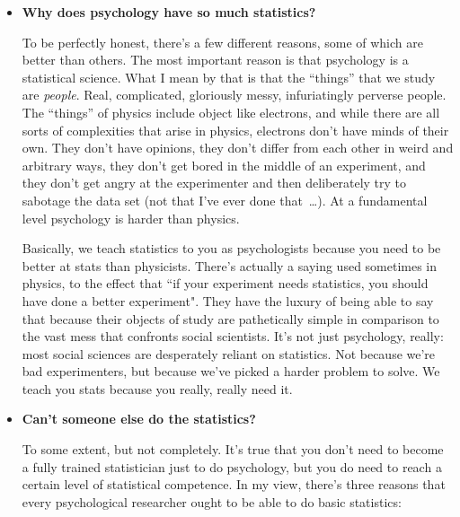 \begin{itemize}

\item {\bf Why does psychology have so much statistics?}

To be perfectly honest, there's a few different reasons, some of which are better than others. The most important reason is that psychology is a statistical science. What I mean by that is that the ``things'' that we study are {\it people}. Real, complicated, gloriously messy, infuriatingly perverse people. The ``things'' of physics include object like electrons, and while there are all sorts of complexities that arise in physics, electrons don't have minds of their own. They don't have opinions, they don't differ from each other in weird and arbitrary ways, they don't get bored in the middle of an experiment, and they don't get angry at the experimenter and then deliberately try to sabotage the data set (not that I've ever done that~\ldots). At a fundamental level psychology is harder than physics.

Basically, we teach statistics to you as psychologists because you need to be better at stats than physicists. There's actually a saying used sometimes in physics, to the effect that ``if your experiment needs statistics, you should have done a better experiment". They have the luxury of being able to say that because their objects of study are pathetically simple in comparison to the vast mess that confronts social scientists. It's not just psychology, really: most social sciences are desperately reliant on statistics. Not because we're bad experimenters, but because we've picked a harder problem to solve. We teach you stats because you really, really need it.

\item {\bf Can't someone else do the statistics?}

To some extent, but not completely. It's true that you don't need to become a fully trained statistician just to do psychology, but you do need to reach a certain level of statistical competence. In my view, there's three reasons that every psychological researcher ought to be able to do basic statistics:


\end{itemize}
